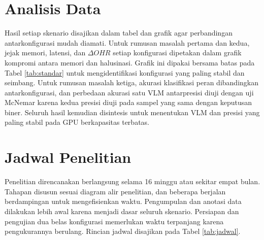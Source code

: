 \section{Analisis Data}
Hasil setiap skenario disajikan dalam tabel dan grafik agar perbandingan antarkonfigurasi mudah diamati. Untuk rumusan masalah pertama dan kedua, jejak memori, latensi, dan $\Delta OHR$ setiap konfigurasi dipetakan dalam grafik kompromi antara memori dan halusinasi. Grafik ini dipakai bersama batas pada Tabel \ref{tab:standar} untuk mengidentifikasi konfigurasi yang paling stabil dan seimbang. Untuk rumusan masalah ketiga, akurasi klasifikasi peran dibandingkan antarkonfigurasi, dan perbedaan akurasi satu VLM antarpresisi diuji dengan uji McNemar karena kedua presisi diuji pada sampel yang sama dengan keputusan biner. Seluruh hasil kemudian disintesis untuk menentukan VLM dan presisi yang paling stabil pada GPU berkapasitas terbatas.

\section{Jadwal Penelitian}
Penelitian direncanakan berlangsung selama 16 minggu atau sekitar empat bulan. Tahapan disusun sesuai diagram alir penelitian, dan beberapa berjalan berdampingan untuk mengefisienkan waktu. Pengumpulan dan anotasi data dilakukan lebih awal karena menjadi dasar seluruh skenario. Persiapan dan pengujian dua belas konfigurasi memerlukan waktu terpanjang karena pengukurannya berulang. Rincian jadwal disajikan pada Tabel \ref{tab:jadwal}.

